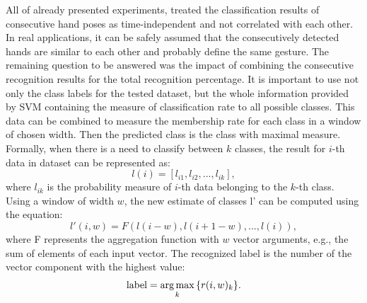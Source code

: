 All of already presented experiments, treated the classification results of consecutive hand poses as time-independent and not correlated with each other.
In real applications, it can be safely assumed that the consecutively detected hands are similar to each other and probably define the same gesture.
The remaining question to be answered was the impact of combining the consecutive recognition results for the total recognition percentage.
It is important to use not only the class labels for the tested dataset, but the whole information provided by SVM containing the measure of classification rate to all possible classes.
This data can be combined to measure the membership rate for each class in a window of chosen width.
Then the predicted class is the class with maximal measure.
Formally, when there is a need to classify between $k$ classes, the result for $i$-th data in dataset can be represented as:
\begin {equation}
l(i) = [l_{i1}, l_{i2}, ..., l_{ik}],
\end{equation}
where $l_{ik}$ is the probability measure of $i$-th data belonging to the $k$-th class.
Using a window of width $w$, the new estimate of classes l' can be computed using the equation:
\begin{equation}
l'(i,w) = F( l(i-w), l(i+1-w), ..., l(i) ),
\end{equation}
where F represents the aggregation function with $w$ vector arguments, e.g., the sum of elements of each input vector.
The recognized label is the number of the vector component with the highest value:
\begin{equation}
\mathrm{label} = \operatorname*{arg\,max}_{k}{\{r(i,w)_k\}}.
\end{equation}


